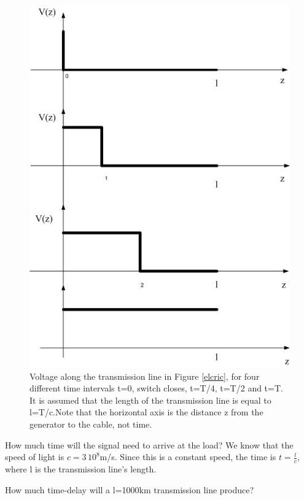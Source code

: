 \documentclass{ximera}
\begin{document}
\begin{figure}[htbp]
\begin{center}
\includegraphics[scale=0.5]{../jpg/timedelayedsignaltl.jpg}
\end{center}
\caption{Voltage along the transmission line in Figure \ref{elcric}, for four different time intervals t=0, switch closes, t=T/4, t=T/2 and t=T. It is assumed that the length of the transmission line is equal to l=T/c.Note that the horizontal axis is the distance z from the generator to the cable, not time. }
\label{delayedsig}
\end{figure}

How much time will the signal need to arrive at the load? We know that the speed of light is $c=3\,10^8$m/s. Since this is a constant speed, the time is $t=\frac{l}{c}$, where l is the transmission line's length.

\begin{question}  
How much time-delay will a l=1000km transmission line produce?  
\begin{multipleChoice}  
\end{multipleChoice}  
\end{question} 
\end{document}
